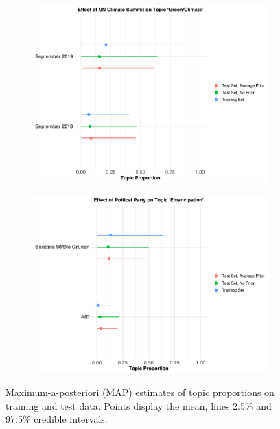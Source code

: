 \begin{figure}[h!]
  \centering
  \captionsetup{justification=centering}
  \begin{subfigure}[b]{0.49\linewidth}
    \includegraphics[width=\linewidth]{../plots/4_7/climate_summit_props.pdf}
  \end{subfigure}
  \begin{subfigure}[b]{0.49\linewidth}
    \includegraphics[width=\linewidth]{../plots/4_7/emancipation_props.pdf}
  \end{subfigure}
  \caption{Maximum-a-posteriori (MAP) estimates of topic proportions on training and test data. Points display the mean, lines 2.5\% and 97.5\% credible intervals.}
  \label{fig:causal_inference_props}
\end{figure}

